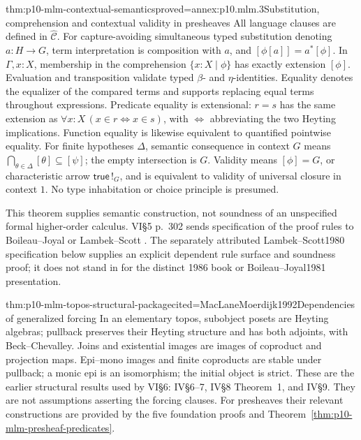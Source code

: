 \begin{hbtheorem}{thm:p10-mlm-contextual-semantics}{proved=annex:p10.mlm.3}{Substitution, comprehension and contextual validity in presheaves}
All language clauses are defined in \(\widehat{\mathcal C}\).
For capture-avoiding simultaneous typed substitution denoting \(a:H\to G\),
term interpretation is composition with \(a\), and \([\phi[a]]=a^*[\phi]\).
In \(\Gamma,x:X\), membership in the comprehension
\(\{x:X\mid\phi\}\) has exactly extension \([\phi]\).
Evaluation and transposition validate typed \(\beta\)- and \(\eta\)-identities.
Equality denotes the equalizer of the compared terms and supports replacing
equal terms throughout expressions. Predicate equality is extensional:
\(r=s\) has the same extension as
\(\forall x:X\,(x\in r\Leftrightarrow x\in s)\), with
\(\Leftrightarrow\) abbreviating the two Heyting implications.
Function equality is likewise equivalent to quantified pointwise equality.
For finite hypotheses \(\Delta\), semantic consequence in context \(G\)
means \(\bigcap_{\theta\in\Delta}[\theta]\subseteq[\psi]\); the empty
intersection is \(G\). Validity means \([\phi]=G\), or characteristic arrow
\(\mathsf{true}\,!_G\), and is equivalent to validity of universal closure
in context \(1\). No type inhabitation or choice principle is presumed.
\end{hbtheorem}

This theorem supplies semantic construction, not soundness of an unspecified
formal higher-order calculus. VI\S5 p.~302 sends specification of the proof
rules to Boileau--Joyal or Lambek--Scott \cite{MacLaneMoerdijk1992}.
The separately attributed Lambek--Scott1980 specification below supplies an
explicit dependent rule surface and soundness proof; it does not stand in
for the distinct 1986 book or Boileau--Joyal1981 presentation.

\begin{hbtheorem}{thm:p10-mlm-topos-structural-package}{cited=MacLaneMoerdijk1992}{Dependencies of generalized forcing}
In an elementary topos, subobject posets are Heyting algebras; pullback
preserves their Heyting structure and has both adjoints, with Beck--Chevalley.
Joins and existential images are images of coproduct and projection maps.
Epi--mono images and finite coproducts are stable under pullback; a monic epi
is an isomorphism; the initial object is strict. These are the earlier
structural results used by VI\S6: IV\S6--7, IV\S8 Theorem~1, and IV\S9.
They are not assumptions asserting the forcing clauses. For presheaves their
relevant constructions are provided by the five foundation proofs and
Theorem~\ref{thm:p10-mlm-presheaf-predicates}.
\end{hbtheorem}

